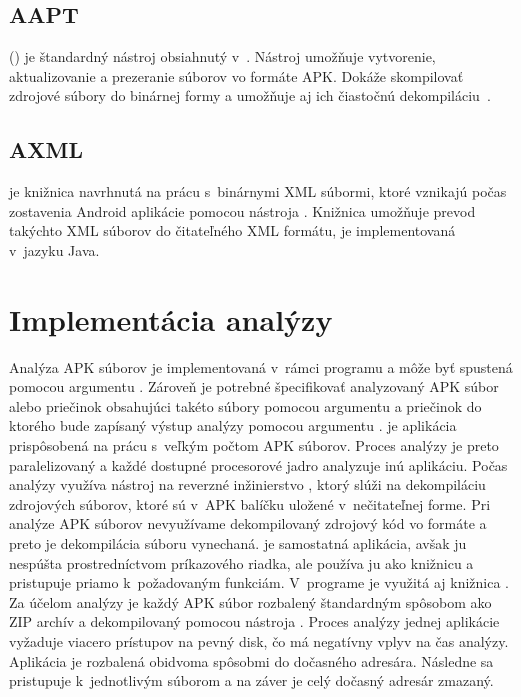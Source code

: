 \subsection{AAPT}
\label{AAPT}

 () je štandardný nástroj obsiahnutý v~. Nástroj  umožňuje vytvorenie, aktualizovanie a prezeranie súborov vo formáte APK. Dokáže skompilovať zdrojové súbory do binárnej formy a umožňuje aj ich čiastočnú dekompiláciu~\cite{aapt}.

\subsection{AXML}
\label{AXML}
 je knižnica navrhnutá na prácu s~binárnymi XML súbormi, ktoré vznikajú počas zostavenia Android aplikácie pomocou nástroja . Knižnica umožňuje prevod takýchto XML súborov do čitateľného XML formátu, je implementovaná v~jazyku Java.

\section{Implementácia analýzy}
Analýza APK súborov je implementovaná v~rámci programu  a môže byť spustená pomocou argumentu . Zároveň je potrebné špecifikovať analyzovaný APK súbor alebo priečinok obsahujúci takéto súbory pomocou argumentu  a priečinok do ktorého bude zapísaný výstup analýzy pomocou argumentu .  je aplikácia prispôsobená na prácu s~veľkým počtom APK súborov. Proces analýzy je preto paralelizovaný a každé dostupné procesorové jadro analyzuje inú aplikáciu. Počas analýzy využíva  nástroj na reverzné inžinierstvo , ktorý slúži na dekompiláciu zdrojových súborov, ktoré sú v~APK balíčku uložené v~nečitateľnej forme. Pri analýze APK súborov nevyužívame dekompilovaný zdrojový kód vo formáte  a preto je dekompilácia súboru  vynechaná.  je samostatná aplikácia, avšak  ju nespúšta prostredníctvom príkazového riadka, ale používa ju ako knižnicu a pristupuje priamo k~požadovaným funkciám. V~programe je využitá aj knižnica . Za účelom analýzy je každý APK súbor rozbalený štandardným spôsobom ako ZIP archív a dekompilovaný pomocou nástroja . Proces analýzy jednej aplikácie vyžaduje viacero prístupov na pevný disk, čo má negatívny vplyv na čas analýzy. Aplikácia je rozbalená obidvoma spôsobmi do dočasného adresára. Následne sa pristupuje k~jednotlivým súborom a na záver je celý dočasný adresár zmazaný.

